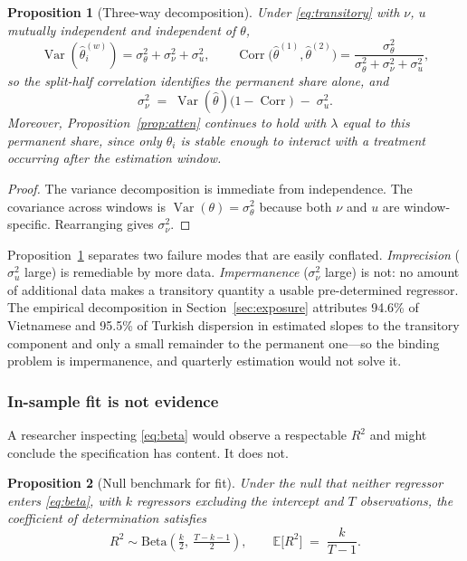 \documentclass[review,12pt,authoryear]{elsarticle}
\theoremstyle{plain}
\newtheorem{proposition}{Proposition}
\theoremstyle{definition}
\newcommand{\E}{\mathbb{E}}
\newcommand{\Var}{\operatorname{Var}}
\newcommand{\Corr}{\operatorname{Corr}}
\begin{document}
\begin{proposition}[Three-way decomposition]
\label{prop:decomp}
Under \eqref{eq:transitory} with $\nu$, $u$ mutually independent and
independent of $\theta$,
\begin{equation}
\Var(\widehat{\theta}^{(w)}_i)=\sigma^2_\theta+\sigma^2_\nu+\sigma^2_u,
\qquad
\Corr\bigl(\widehat{\theta}^{(1)},\widehat{\theta}^{(2)}\bigr)
=\frac{\sigma^2_\theta}{\sigma^2_\theta+\sigma^2_\nu+\sigma^2_u},
\end{equation}
so the split-half correlation identifies the \emph{permanent} share alone, and
\begin{equation}
\sigma^2_\nu \;=\; \Var(\widehat{\theta})\bigl(1-\Corr\bigr)\;-\;\sigma^2_u .
\end{equation}
Moreover, Proposition~\ref{prop:atten} continues to hold with $\lambda$ equal to
this permanent share, since only $\theta_i$ is stable enough to interact with a
treatment occurring after the estimation window.
\end{proposition}

\begin{proof}
The variance decomposition is immediate from independence. The covariance across
windows is $\Var(\theta)=\sigma^2_\theta$ because both $\nu$ and $u$ are
window-specific. Rearranging gives $\sigma^2_\nu$. \end{proof}

Proposition~\ref{prop:decomp} separates two failure modes that are easily
conflated. \emph{Imprecision} ($\sigma^2_u$ large) is remediable by more data.
\emph{Impermanence} ($\sigma^2_\nu$ large) is not: no amount of additional data
makes a transitory quantity a usable pre-determined regressor. The empirical
decomposition in Section~\ref{sec:exposure} attributes 94.6\% of Vietnamese and
95.5\% of Turkish dispersion in estimated slopes to the transitory component and
only a small remainder to the permanent one---so the binding problem is
impermanence, and quarterly estimation would not solve it.

\subsubsection{In-sample fit is not evidence}

A researcher inspecting \eqref{eq:beta} would observe a respectable $R^2$ and
might conclude the specification has content. It does not.

\begin{proposition}[Null benchmark for fit]
\label{prop:r2}
Under the null that neither regressor enters \eqref{eq:beta}, with $k$
regressors excluding the intercept and $T$ observations, the coefficient of
determination satisfies
\begin{equation}
R^2 \sim \mathrm{Beta}\!\left(\tfrac{k}{2},\ \tfrac{T-k-1}{2}\right),
\qquad
\E\bigl[R^2\bigr] \;=\; \frac{k}{T-1}.
\end{equation}
\end{proposition}
\end{document}
